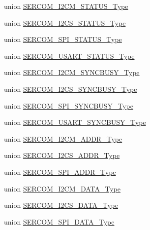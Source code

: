 \begin{DoxyCompactItemize}
union \mbox{\hyperlink{union_s_e_r_c_o_m___i2_c_m___s_t_a_t_u_s___type}{S\+E\+R\+C\+O\+M\+\_\+\+I2\+C\+M\+\_\+\+S\+T\+A\+T\+U\+S\+\_\+\+Type}}
\item 
union \mbox{\hyperlink{union_s_e_r_c_o_m___i2_c_s___s_t_a_t_u_s___type}{S\+E\+R\+C\+O\+M\+\_\+\+I2\+C\+S\+\_\+\+S\+T\+A\+T\+U\+S\+\_\+\+Type}}
\item 
union \mbox{\hyperlink{union_s_e_r_c_o_m___s_p_i___s_t_a_t_u_s___type}{S\+E\+R\+C\+O\+M\+\_\+\+S\+P\+I\+\_\+\+S\+T\+A\+T\+U\+S\+\_\+\+Type}}
\item 
union \mbox{\hyperlink{union_s_e_r_c_o_m___u_s_a_r_t___s_t_a_t_u_s___type}{S\+E\+R\+C\+O\+M\+\_\+\+U\+S\+A\+R\+T\+\_\+\+S\+T\+A\+T\+U\+S\+\_\+\+Type}}
\item 
union \mbox{\hyperlink{union_s_e_r_c_o_m___i2_c_m___s_y_n_c_b_u_s_y___type}{S\+E\+R\+C\+O\+M\+\_\+\+I2\+C\+M\+\_\+\+S\+Y\+N\+C\+B\+U\+S\+Y\+\_\+\+Type}}
\item 
union \mbox{\hyperlink{union_s_e_r_c_o_m___i2_c_s___s_y_n_c_b_u_s_y___type}{S\+E\+R\+C\+O\+M\+\_\+\+I2\+C\+S\+\_\+\+S\+Y\+N\+C\+B\+U\+S\+Y\+\_\+\+Type}}
\item 
union \mbox{\hyperlink{union_s_e_r_c_o_m___s_p_i___s_y_n_c_b_u_s_y___type}{S\+E\+R\+C\+O\+M\+\_\+\+S\+P\+I\+\_\+\+S\+Y\+N\+C\+B\+U\+S\+Y\+\_\+\+Type}}
\item 
union \mbox{\hyperlink{union_s_e_r_c_o_m___u_s_a_r_t___s_y_n_c_b_u_s_y___type}{S\+E\+R\+C\+O\+M\+\_\+\+U\+S\+A\+R\+T\+\_\+\+S\+Y\+N\+C\+B\+U\+S\+Y\+\_\+\+Type}}
\item 
union \mbox{\hyperlink{union_s_e_r_c_o_m___i2_c_m___a_d_d_r___type}{S\+E\+R\+C\+O\+M\+\_\+\+I2\+C\+M\+\_\+\+A\+D\+D\+R\+\_\+\+Type}}
\item 
union \mbox{\hyperlink{union_s_e_r_c_o_m___i2_c_s___a_d_d_r___type}{S\+E\+R\+C\+O\+M\+\_\+\+I2\+C\+S\+\_\+\+A\+D\+D\+R\+\_\+\+Type}}
\item 
union \mbox{\hyperlink{union_s_e_r_c_o_m___s_p_i___a_d_d_r___type}{S\+E\+R\+C\+O\+M\+\_\+\+S\+P\+I\+\_\+\+A\+D\+D\+R\+\_\+\+Type}}
\item 
union \mbox{\hyperlink{union_s_e_r_c_o_m___i2_c_m___d_a_t_a___type}{S\+E\+R\+C\+O\+M\+\_\+\+I2\+C\+M\+\_\+\+D\+A\+T\+A\+\_\+\+Type}}
\item 
union \mbox{\hyperlink{union_s_e_r_c_o_m___i2_c_s___d_a_t_a___type}{S\+E\+R\+C\+O\+M\+\_\+\+I2\+C\+S\+\_\+\+D\+A\+T\+A\+\_\+\+Type}}
\item 
union \mbox{\hyperlink{union_s_e_r_c_o_m___s_p_i___d_a_t_a___type}{S\+E\+R\+C\+O\+M\+\_\+\+S\+P\+I\+\_\+\+D\+A\+T\+A\+\_\+\+Type}}

\end{DoxyCompactItemize}
